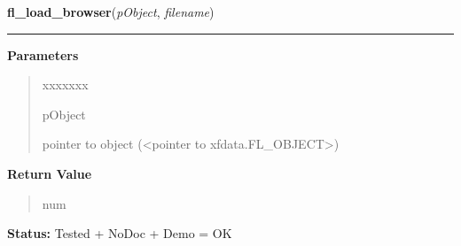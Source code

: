\hspace{.8\funcindent}\begin{boxedminipage}{\funcwidth}

    \raggedright \textbf{fl\_load\_browser}(\textit{pObject}, \textit{filename})

    \vspace{-1.5ex}

    \rule{\textwidth}{0.5\fboxrule}
\setlength{\parskip}{2ex}
\setlength{\parskip}{1ex}
      \textbf{Parameters}
      \vspace{-1ex}

      \begin{quote}
        \begin{Ventry}{xxxxxxx}

          \item[pObject]

          pointer to object ({\textless}pointer to 
          xfdata.FL\_OBJECT{\textgreater})

        \end{Ventry}

      \end{quote}

      \textbf{Return Value}
    \vspace{-1ex}

      \begin{quote}
      num

      \end{quote}

\textbf{Status:} Tested + NoDoc + Demo = OK



    \end{boxedminipage}

    \label{xformslib:library:fl_select_browser_line}

    \vspace{0.5ex}

